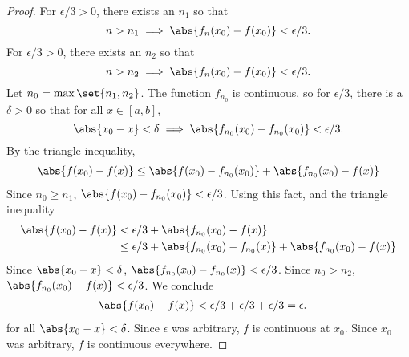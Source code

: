\begin{prop}
\begin{proof}
For $\epsilon/3 > 0$, there exists an $n_1$
so that
\[
  n > n_1 \implies \abs{f_n(x_0) - f(x_0)} < \epsilon/3.
\]
For $\epsilon/3 > 0$, there exists an $n_2$
so that
\[
  n > n_2 \implies \abs{f_n(x_0) - f(x_0)} < \epsilon/3.
\]
Let $n_0 = \max\set{n_1,n_2}$.
The function $f_{n_0}$ is
continuous, so for $\epsilon/3$,
there is a $\delta > 0$ so that
for all $x \in [a, b]$,
\[
  \abs{x_0 - x} < \delta \implies \abs{f_{n_0}(x_0) - f_{n_0}(x_0)} < \epsilon/3.
\]
By the triangle inequality,
\[
  \begin{aligned}
    \abs{f(x_0) - f(x)} \leq \abs{f(x_0) - f_{n_0}(x_0)} + \abs{f_{n_0}(x_0) - f(x)}
  \end{aligned}
\]
Since $n_0 \geq n_1$,
$\abs{f(x_0) - f_{n_0}(x_0)} < \epsilon/3$.
Using this fact, and the triangle inequality
\[
  \begin{aligned}
    \abs{f(x_0) - f(x)} &< \epsilon/3 + \abs{f_{n_0}(x_0) - f(x)} \\
    &\leq \epsilon/3 + \abs{f_{n_0}(x_0) - f_{n_0}(x)} + \abs{f_{n_0}(x_0) - f(x)} \\
  \end{aligned}
\]
Since $\abs{x_0 - x} < \delta$,
$\abs{f_{n_0}(x_0) - f_{n_0}(x)} < \epsilon/3$.
Since $n_0 > n_2$,
$\abs{f_{n_0}(x_0) - f(x)} < \epsilon/3$.
We conclude
\[
  \begin{aligned}
    \abs{f(x_0) - f(x)} &< \epsilon/3 + \epsilon/3 + \epsilon/3 = \epsilon.
  \end{aligned}
\]
for all $\abs{x_0-x} < \delta$.
Since $\epsilon$ was arbitrary, $f$
is continuous at $x_0$.
Since $x_0$ was arbitrary,
$f$ is continuous everywhere.
\end{proof}

\end{prop}

\strats
